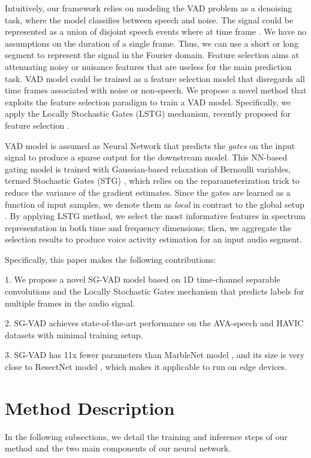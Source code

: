 \documentclass{article}
\begin{document}
Intuitively, our framework relies on modeling the VAD problem as a denoising task, where the model classifies between speech and noise. The signal could be represented as a union of disjoint speech events  where  at time frame . We have no assumptions on the duration of a single frame. Thus, we can use a short or long segment to represent the signal in the Fourier domain. Feature selection aims at attenuating noisy or nuisance features that are useless for the main prediction task. VAD model could
be trained as a feature selection model that disregards all time frames associated with noise or non-speech. We propose a novel method that exploits the feature selection paradigm to train a VAD model. 
Specifically, we apply the Locally Stochastic Gates (LSTG) mechanism, recently proposed for feature selection \cite{lindenbaum2021differentiable, yang2022locally}. 

VAD model is assumed as Neural Network that predicts the \textit{gates} on the input signal to produce a sparse output for the downstream model. This NN-based gating model is trained with Gaussian-based relaxation of Bernoulli variables, termed Stochastic Gates (STG) \cite{yamada2020feature}, which relies
on the reparameterization trick \cite{miller2017reducing, figurnov2018implicit} to reduce the variance of the gradient estimates. Since the gates are learned as a function of input samples, we denote them as \textit{local} \cite{yang2022locally} in contrast to the global setup \cite{lindenbaum2021differentiable}. By applying LSTG method, we select the most informative features in spectrum representation in both time and frequency dimensions; then, we aggregate the selection results to produce voice activity estimation for an input audio segment.

Specifically, this paper makes the following contributions: 

1. We propose a novel SG-VAD model based on 1D time-channel separable convolutions and the Locally Stochastic Gates mechanism that predicts labels for multiple frames in the audio signal.

2.  SG-VAD achieves state-of-the-art performance on the AVA-speech \cite{chaudhuri2018ava} and HAVIC datasets \cite{strassel2012creating} with minimal training setup.

3.  SG-VAD has 11x fewer parameters than MarbleNet model \cite{chaudhuri2018ava}, and its size is very close to ResectNet model \cite{kopuklu2022resectnet}, which makes it applicable to run on edge devices.

\section{Method Description}
In the following subsections, we detail the training and inference steps of our method and the two main components of our neural network.
\end{document}
